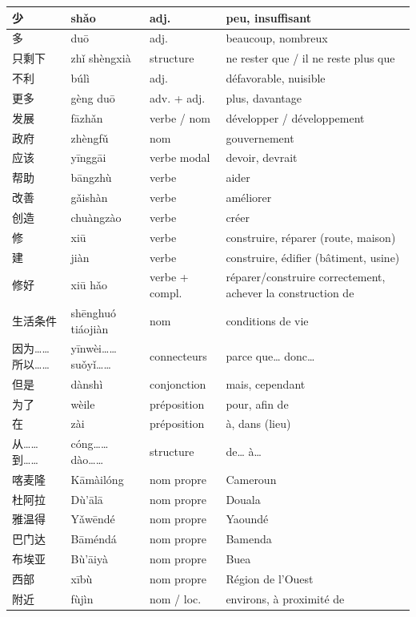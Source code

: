 \documentclass[11pt]{article}
\begin{document}
\begin{center}
\begin{tabularx}{\linewidth}{|X|X|X|X|}
\hline
少 & shǎo & adj. & peu, insuffisant \\
\hline
多 & duō & adj. & beaucoup, nombreux \\
\hline
只剩下 & zhǐ shèngxià & structure & ne rester que / il ne reste plus que \\
\hline
不利 & búlì & adj. & défavorable, nuisible \\
\hline
更多 & gèng duō & adv. + adj. & plus, davantage \\
\hline
发展 & fāzhǎn & verbe / nom & développer / développement \\
\hline
政府 & zhèngfǔ & nom & gouvernement \\
\hline
应该 & yīnggāi & verbe modal & devoir, devrait \\
\hline
帮助 & bāngzhù & verbe & aider \\
\hline
改善 & gǎishàn & verbe & améliorer \\
\hline
创造 & chuàngzào & verbe & créer \\
\hline
修 & xiū & verbe & construire, réparer (route, maison) \\
\hline
建 & jiàn & verbe & construire, édifier (bâtiment, usine) \\
\hline
修好 & xiū hǎo & verbe + compl. & réparer/construire correctement, achever la construction de \\
\hline
生活条件 & shēnghuó tiáojiàn & nom & conditions de vie \\
\hline
因为……所以…… & yīnwèi……suǒyǐ…… & connecteurs & parce que… donc… \\
\hline
但是 & dànshì & conjonction & mais, cependant \\
\hline
为了 & wèile & préposition & pour, afin de \\
\hline
在 & zài & préposition & à, dans (lieu) \\
\hline
从……到…… & cóng……dào…… & structure & de… à… \\
\hline
喀麦隆 & Kāmàilóng & nom propre & Cameroun \\
\hline
杜阿拉 & Dù'ālā & nom propre & Douala \\
\hline
雅温得 & Yǎwēndé & nom propre & Yaoundé \\
\hline
巴门达 & Bāméndá & nom propre & Bamenda \\
\hline
布埃亚 & Bù'āiyà & nom propre & Buea \\
\hline
西部 & xībù & nom propre & Région de l'Ouest \\
\hline
附近 & fùjìn & nom / loc. & environs, à proximité de \\
\hline
\end{tabularx}
\end{center}
\end{document}
